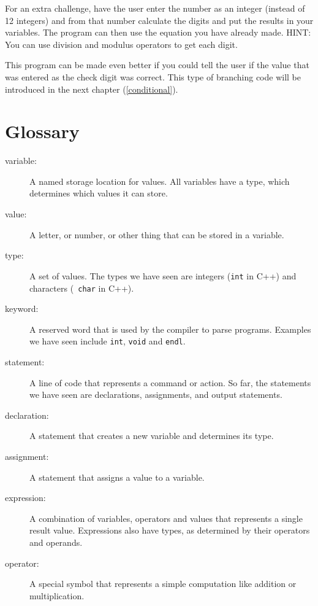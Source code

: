 For an extra challenge, have the user enter the number as
an integer (instead of 12 integers) and from that number
calculate the digits and put the results in your variables.
The program can then use the equation you have already made.
HINT: You can use division and modulus operators to get
each digit.

This program can be made even better if you could tell the
user if the value that was entered as the check digit was 
correct. This type of branching code will be introduced in 
the next chapter (\ref{conditional}).
\section{Glossary}
\begin{description}

\item[variable:] A named storage location for values.  All
variables have a type, which determines which values it can
store.

\item[value:] A letter, or number, or other thing that can be
stored in a variable.  

\item[type:] A set of values.  The types
we have seen are integers ({\tt int} in C++) and characters ({\tt
char} in C++).

\item[keyword:]  A reserved word that is used by the compiler
to parse programs.  Examples we have seen include {\tt int},
{\tt void} and {\tt endl}.

\item[statement:] A line of code that represents a command or
action.  So far, the statements we have seen are declarations,
assignments, and output statements.

\item[declaration:] A statement that creates a new variable and
determines its type.

\item[assignment:] A statement that assigns a value to a variable.

\item[expression:] A combination of variables, operators and
values that represents a single result value.  Expressions also
have types, as determined by their operators and operands.

\item[operator:] A special symbol that represents a simple
computation like addition or multiplication.


\end{description}
